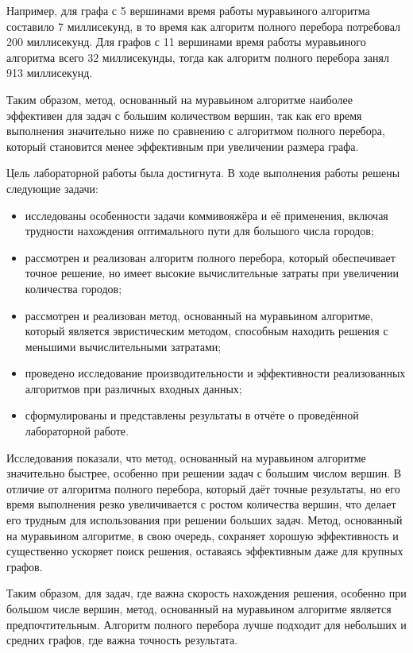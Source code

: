 Например, для графа с 5 вершинами время работы муравьиного алгоритма составило 7 миллисекунд, в то время как алгоритм полного перебора потребовал 200 миллисекунд. Для графов с 11 вершинами время работы муравьиного алгоритма всего 32 миллисекунды, тогда как алгоритм полного перебора занял 913 миллисекунд.

Таким образом, метод, основанный на муравьином алгоритме наиболее эффективен для задач с большим количеством вершин, так как его время выполнения значительно ниже по сравнению с алгоритмом полного перебора, который становится менее эффективным при увеличении размера графа.


\clearpage
{}

Цель лабораторной работы была достигнута. В ходе выполнения работы решены следующие задачи:

\begin{itemize}
  \item исследованы особенности задачи коммивояжёра и её применения, включая трудности нахождения оптимального пути для большого числа городов;
  \item рассмотрен и реализован алгоритм полного перебора, который обеспечивает точное решение, но имеет высокие вычислительные затраты при увеличении количества городов;
  \item рассмотрен и реализован метод, основанный на муравьином алгоритме, который является эвристическим методом, способным находить решения с меньшими вычислительными затратами;
  \item проведено исследование производительности и эффективности реализованных алгоритмов при различных входных данных;
  \item сформулированы и представлены результаты в отчёте о проведённой лабораторной работе.
\end{itemize}

Исследования показали, что метод, основанный на муравьином алгоритме значительно быстрее, особенно при решении задач с большим числом вершин. В отличие от алгоритма полного перебора, который даёт точные результаты, но его время выполнения резко увеличивается с ростом количества вершин, что делает его трудным для использования при решении больших задач. Метод, основанный на муравьином алгоритме, в свою очередь, сохраняет хорошую эффективность и существенно ускоряет поиск решения, оставаясь эффективным даже для крупных графов.

Таким образом, для задач, где важна скорость нахождения решения, особенно при большом числе вершин, метод, основанный на муравьином алгоритме является предпочтительным. Алгоритм полного перебора лучше подходит для небольших и средних графов, где важна точность результата.